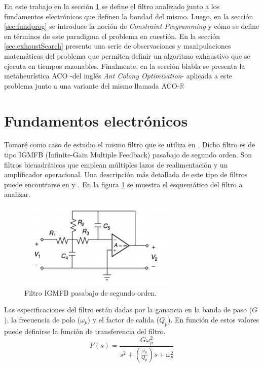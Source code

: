 \documentclass{llncs}
\begin{document}
    En este trabajo en la sección \ref{sec:fundelect} se define el filtro analizado
    junto a los fundamentos electrónicos que definen la bondad del mismo. Luego, en la
    sección \ref{sec:fundprog} se introduce la noción de \textit{Constraint Programming}
    y cómo se define en términos de este paradigma el problema en cuestión. En la sección
    \ref{sec:exhaustSearch} presento una serie de observaciones y manipulaciones matemáticas del problema que permiten definir un algoritmo exhaustivo que se ejecuta
    en tiempos razonables. Finalmente, en la sección blabla se presenta la metaheurística ACO
    -del inglés \textit{Ant Colony Optimization}- aplicada a este problema junto a una variante 
    del mismo llamada ACO-$\mathbb{R} $
    
    
  \section{\textbf{Fundamentos electr\'onicos}}
    \label{sec:fundelect}
    Tomaré como caso de estudio el mismo filtro que se utiliza en \cite{lov:rom:per}. Dicho filtro
    es de tipo IGMFB (Infinite-Gain Multiple Feedback) pasabajo de segundo orden. Son filtros
    bicuadráticos que emplean múltiples lazos de realimentación y un amplificador operacional.
    Una descripción más detallada de este tipo de filtros puede encontrarse en \cite{dim} y \cite{rau:swa}. En la figura \ref{fig:filter} se muestra el esquemático del filtro a analizar.
   
   \begin{figure}
   	\includegraphics[width=\linewidth]{filter.png}
   	\caption{Filtro IGMFB pasabajo de segundo orden.}
   	\label{fig:filter}
   \end{figure}

	Las especificaciones del filtro están dadas por la ganancia en la banda de paso ($G$), la
	frecuencia de polo ($\omega_p$) y el factor de calida ($Q_p$). En función de estos valores
	puede definirse la función de transferencia del filtro.
 	\begin{equation}
		F(s) = \frac{G\omega_p^2}{s^2+(\frac{\omega_p}{Q_p})s+\omega_p^2}
		\label{funcTransfer}
	\end{equation}
	
\end{document}
